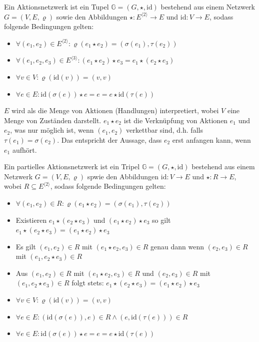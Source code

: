 \documentclass{article}
\begin{document}
\begin{definition}
  Ein Aktionsnetzwerk ist ein Tupel $\mathbb{G} = (G, \star, \text{id})$ 
  bestehend aus einem Netzwerk $G = (V, E, \varrho)$
  sowie den Abbildungen $\star \colon E^{\langle 2 \rangle} \to E$ und $\text{id} \colon V \to E$,
  sodass folgende Bedingungen gelten:
  \begin{itemize}
    \item $\forall (e_1, e_2) \in E^{\langle 2 \rangle} \colon \varrho(e_1 \star e_2) = (\sigma(e_1), \tau(e_2))$
    \item $\forall (e_1, e_2, e_3) \in E^{\langle 3 \rangle} \colon (e_1 \star e_2) \star e_3 = e_1 \star (e_2 \star e_3)$
    \item $\forall v \in V \colon \varrho(\text{id}(v)) = (v, v)$
    \item $\forall e \in E \colon \text{id}(\sigma(e)) \star e = e = e \star \text{id}(\tau(e))$
  \end{itemize}
  $E$ wird als die Menge von Aktionen (Handlungen) interpretiert,
  wobei $V$ eine Menge von Zuständen darstellt.
  $e_1 \star e_2$ ist die Verknüpfung von Aktionen $e_1$ und $e_2$,
  was nur möglich ist, wenn $(e_1, e_2)$ verkettbar sind, 
  d.h. falls $\tau(e_1) = \sigma(e_2)$.
  Das entspricht der Aussage, dass $e_2$ erst anfangen kann, wenn $e_1$ aufhört.
\end{definition}

\begin{definition}
  Ein partielles Aktionsnetzwerk ist ein Tripel $\mathbb{G} = (G, \star, \text{id})$
  bestehend aus einem Netzwerk $G = (V, E, \varrho)$ spwie den Abbildungen 
  $\text{id} \colon V  \to E$ und $\star \colon R \to E$, wobei $R \subseteq E^{\langle 2 \rangle}$,
  sodass folgende Bedingungen gelten:
  \begin{itemize}
      \item $\forall (e_1, e_2) \in R \colon \varrho(e_1 \star e_2) = (\sigma(e_1), \tau(e_2))$
      \item Existieren $e_1 \star (e_2 \star e_3)$ und $(e_1 \star e_2) \star e_3$
            so gilt $e_1 \star (e_2 \star e_3) = (e_1 \star e_2) \star e_3$
      \item Es gilt $(e_1, e_2) \in R$ mit $(e_1 \star e_2, e_3) \in R$ genau dann wenn 
            $(e_2, e_3) \in R$ mit $(e_1, e_2 \star e_3) \in R$
      \item Aus $(e_1, e_2) \in R$ mit $(e_1 \star e_2, e_3) \in R$ und
            $(e_2, e_3) \in R$ mit $(e_1, e_2 \star e_3) \in R$ folgt stets:
            $e_1 \star (e_2 \star e_3) = (e_1 \star e_2) \star e_3$
      \item $\forall v \in V \colon \varrho(\text{id}(v)) = (v, v)$
      \item $\forall e \in E \colon (\text{id}(\sigma(e)), e) \in R \wedge (e, \text{id}(\tau(e))) \in R$
      \item $\forall e \in E \colon \text{id}(\sigma(e)) \star e = e = e \star \text{id}(\tau(e))$
  \end{itemize}
\end{definition}
\end{document}
